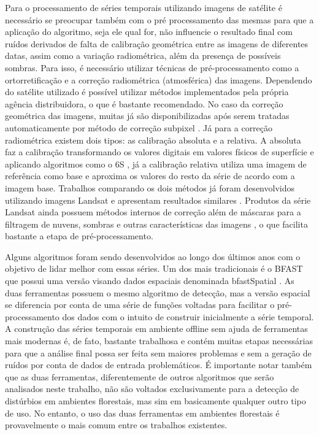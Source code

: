 Para o processamento de séries temporais utilizando imagens de satélite é necessário se preocupar também com o pré processamento das mesmas para que a aplicação do algoritmo, seja ele qual for, não influencie o resultado final com ruídos derivados de falta de calibração geométrica entre as imagens de diferentes datas, assim como a variação radiométrica, além da presença de possíveis sombras. Para isso, é necessário utilizar técnicas de pré-processamento como a ortorretificação e a correção radiométrica (atmosférica) das imagens. Dependendo do satélite utilizado é possível utilizar métodos implementados pela própria agência distribuidora, o que é bastante recomendado. No caso da correção geométrica das imagens, muitas já são disponibilizadas após serem tratadas automaticamente por método de correção subpixel \citep{Gutjahr2014}. Já para a correção radiométrica existem dois tipos: as calibração absoluta e a relativa. A absoluta faz a calibração transformando os valores digitais em valores físicos de superfície e aplicando algoritmos como o 6S \citep{Sagan2004}, já a calibração relativa utiliza uma imagem de referência como base e aproxima os valores do resto da série de acordo com a imagem base. Trabalhos comparando os dois métodos já foram desenvolvidos utilizando imagens Landsat e apresentam resultados similares \citep{Chen2010}. Produtos da série Landsat ainda possuem métodos internos de correção além de máscaras para a filtragem de nuvens, sombras e outras características das imagens \citep{ZHU2015269, ZHU201283, Huang2010}, o que facilita bastante a etapa de pré-processamento.

Alguns algoritmos foram sendo desenvolvidos ao longo dos últimos anos com o objetivo de lidar melhor com essas séries. Um dos mais tradicionais é o BFAST \sloppy  \citep{VERBESSELT2010106, VERBESSELT20102970, VERBESSELT201298} que possui uma versão visando dados espaciais denominada bfastSpatial \citep{bfastSpatial}. As duas ferramentas possuem o mesmo algoritmo de detecção, mas a versão espacial se diferencia por conta de uma série de funções voltadas para facilitar o pré-processamento dos dados com o intuito de construir inicialmente a série temporal. A construção das séries temporais em ambiente offline sem ajuda de ferramentas mais modernas é, de fato, bastante trabalhosa e contém muitas etapas necessárias para que a análise final possa ser feita sem maiores problemas e sem a geração de ruídos por conta de dados de entrada problemáticos. É importante notar também que as duas ferramentas, diferentemente de outros algoritmos que serão analisados neste trabalho, não são voltados exclusivamente para a detecção de distúrbios em ambientes florestais,  mas sim em basicamente qualquer outro tipo de uso. No entanto, o uso das duas ferramentas em ambientes florestais é provavelmente o mais comum entre os trabalhos existentes. 

